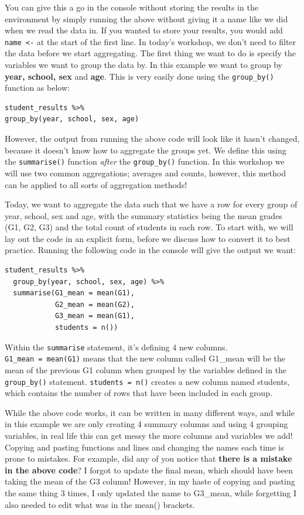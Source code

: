 \documentclass[
  12pt,
]{article}
\begin{document}
You can give this a go in the console without storing the results in the
environment by simply running the above without giving it a name like we
did when we read the data in. If you wanted to store your results, you
would add \texttt{name\ \textless{}-} at the start of the first line. In
today's workshop, we don't need to filter the data before we start
aggregating. The first thing we want to do is specify the variables we
want to group the data by. In this example we want to group by
\textbf{year, school, sex} and \textbf{age}. This is very easily done
using the \texttt{group\_by()} function as below:

\begin{verbatim}
student_results %>%
group_by(year, school, sex, age)
\end{verbatim}

However, the output from running the above code will look like it hasn't
changed, because it doesn't know how to aggregate the groups yet. We
define this using the \texttt{summarise()} function \emph{after} the
\texttt{group\_by()} function. In this workshop we will use two common
aggregations; averages and counts, however, this method can be applied
to all sorts of aggregation methods!

Today, we want to aggregate the data such that we have a row for every
group of year, school, sex and age, with the summary statistics being
the mean grades (G1, G2, G3) and the total count of students in each
row. To start with, we will lay out the code in an explicit form, before
we discuss how to convert it to best practice. Running the following
code in the console will give the output we want:

\begin{verbatim}
student_results %>%
  group_by(year, school, sex, age) %>%
  summarise(G1_mean = mean(G1), 
            G2_mean = mean(G2), 
            G3_mean = mean(G1),
            students = n())
\end{verbatim}

Within the \texttt{summarise} statement, it's defining 4 new columns.
\texttt{G1\_mean\ =\ mean(G1)} means that the new column called G1\_mean
will be the mean of the previous G1 column when grouped by the variables
defined in the \texttt{group\_by()} statement. \texttt{students\ =\ n()}
creates a new column named students, which contains the number of rows
that have been included in each group.

While the above code works, it can be written in many different ways,
and while in this example we are only creating 4 summary columns and
using 4 grouping variables, in real life this can get messy the more
columns and variables we add! Copying and pasting functions and lines
and changing the names each time is prone to mistakes. For example, did
any of you notice that \textbf{there is a mistake in the above code}? I
forgot to update the final mean, which should have been taking the mean
of the G3 column! However, in my haste of copying and pasting the same
thing 3 times, I only updated the name to G3\_mean, while forgetting I
also needed to edit what was in the mean() brackets.
\end{document}
